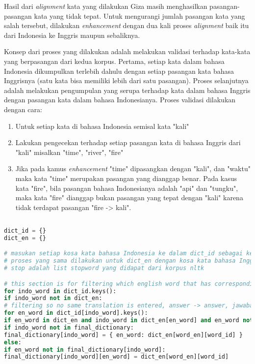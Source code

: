 Hasil dari \textit{alignment} kata yang dilakukan Giza masih menghasilkan pasangan-pasangan kata yang tidak tepat. Untuk mengurangi jumlah pasangan kata yang salah tersebut, dilakukan \textit{enhancement} dengan dua kali proses \textit{alignment} baik itu dari Indonesia ke Inggris maupun sebaliknya.

Konsep dari proses yang dilakukan adalah melakukan validasi terhadap kata-kata yang berpasangan  dari kedua korpus. Pertama, setiap kata dalam bahasa Indonesia dikumpulkan terlebih dahulu dengan setiap pasangan kata bahasa Inggrisnya (satu kata bisa memiliki lebih dari satu pasangan). Proses selanjutnya adalah melakukan pengumpulan yang serupa terhadap kata dalam bahasa Inggris dengan pasangan kata dalam bahasa Indonesianya. Proses validasi dilakukan dengan cara:

\begin{enumerate}
	\item Untuk setiap kata di bahasa Indonesia semisal kata "kali"
	\item Lakukan pengecekan terhadap setiap pasangan kata di bahasa Inggris dari "kali" misalkan "time", "river", "fire"
	\item Jika pada kamus \textit{enhancement} "time" dipasangkan dengan "kali", dan "waktu" maka kata "time" merupakan pasangan yang dianggap benar. Pada kasus kata "fire", bila pasangan bahasa Indonesianya adalah "api" dan "tungku", maka kata "fire" dianggap bukan pasangan yang tepat dengan "kali" karena tidak terdapat pasangan "fire -> kali".
\end{enumerate} 

\begin{lstlisting}[language=Python, caption={Word Alignment Enhancement}, label={word-alignment-enhancement}]

dict_id = {}
dict_en = {}

# masukan setiap kosa kata bahasa Indonesia ke dalam dict_id sebagai key dan kumpulan pasangan kata bahasa inggrisnya sebagai value
# proses yang sama dilakukan untuk dict_en dengan kosa kata bahasa Inggris sebagai key dan kumpulan pasangan kata bahasa Indonesia sebagai value
# stop adalah list stopword yang didapat dari korpus nltk

# this section is for filtering which english word that has corresponding indo translation (bidirectional) from Giza output
for indo_word in dict_id.keys():
if indo_word not in dict_en:
# filtering so no same translation is entered, answer -> answer, jawaban -> jawaban
for en_word in dict_id[indo_word].keys():
if en_word in dict_en and indo_word in dict_en[en_word] and en_word not in stop:
if indo_word not in final_dictionary:
final_dictionary[indo_word] = { en_word: dict_en[word_en][word_id] }
else:
if en_word not in final_dictionary[indo_word]:
final_dictionary[indo_word][en_word] = dict_en[word_en][word_id]
\end{lstlisting}

